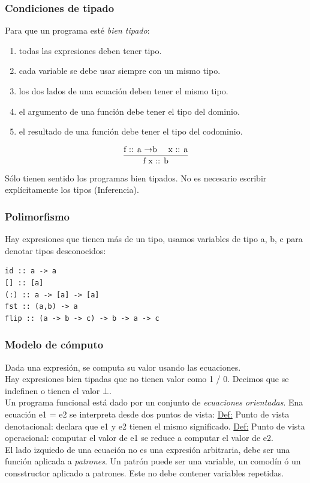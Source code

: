 \documentclass[12pt]{extarticle}
\def\definicion{\newline\underline{Def:} }
\def\flecha{$\rightarrow$}
\def\ssspace{\space\space\space}
\begin{document}
\subsubsection{Condiciones de tipado}
Para que un programa esté \textit{bien tipado}:

\begin{enumerate}
\itemsep-0.35em 
\item todas las expresiones deben tener tipo.
\item cada variable se debe usar siempre con un mismo tipo.
\item los dos lados de una ecuación deben tener el mismo tipo.
\item el argumento de una función debe tener el tipo del dominio.
\item el resultado de una función debe tener el tipo del codominio.
\end{enumerate}

\begin{equation}
\frac{\text{f :: a \flecha b \ssspace x :: a}}{\text{f x :: b}}
\end{equation}

Sólo tienen sentido los programas bien tipados.
No es necesario escribir explícitamente los tipos (Inferencia).

\subsubsection{Polimorfismo}
Hay expresiones que tienen más de un tipo, usamos variables de tipo a, b, c para denotar tipos desconocidos:

\begin{verbatim}
id :: a -> a
[] :: [a]
(:) :: a -> [a] -> [a]
fst :: (a,b) -> a
flip :: (a -> b -> c) -> b -> a -> c
\end{verbatim}

\subsubsection{Modelo de cómputo}
Dada una expresión, se computa su valor usando las ecuaciones. \\
Hay expresiones bien tipadas que no tienen valor como 1 / 0. Decimos que se indefinen o tienen el valor $\bot$. \\
Un programa funcional está dado por un conjunto de \textit{ecuaciones orientadas}. Ena ecuación e1 = e2 se interpreta desde dos puntos de vista:
\definicion Punto de vista denotacional: declara que e1 y e2 tienen el mismo significado.
\definicion Punto de vista operacional: computar el valor de e1 se reduce a computar el valor de e2. \\
El lado izquiedo de una ecuación no es una expresión arbitraria, debe ser una función aplicada a \textit{patrones}. Un patrón puede ser una variable, un comodín ó un consstructor aplicado a patrones. Este no debe contener variables repetidas.
\end{document}
